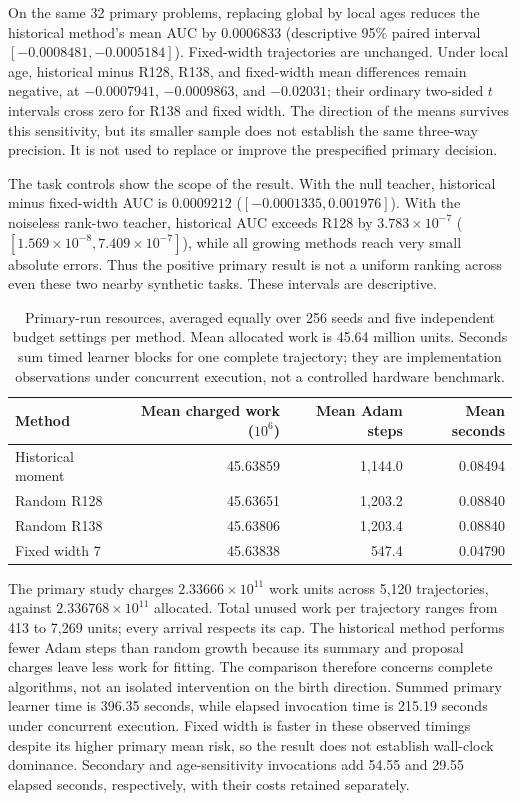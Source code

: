 \documentclass[10pt]{article}
\begin{document}
On the same 32 primary problems, replacing global by local ages
reduces the historical method's mean AUC by $0.0006833$
(descriptive 95\% paired interval $[-0.0008481,-0.0005184]$).
Fixed-width trajectories are unchanged. Under local age, historical
minus R128, R138, and fixed-width mean differences remain negative,
at $-0.0007941$, $-0.0009863$, and $-0.02031$; their ordinary
two-sided $t$ intervals cross zero for R138 and fixed width. The
direction of the means survives this sensitivity, but its smaller
sample does not establish the same three-way precision. It is not
used to replace or improve the prespecified primary decision.

The task controls show the scope of the result. With the null teacher,
historical minus fixed-width AUC is $0.0009212$
($[-0.0001335,0.001976]$). With the noiseless rank-two teacher,
historical AUC exceeds R128 by $3.783\times10^{-7}$
($[1.569\times10^{-8},7.409\times10^{-7}]$), while all growing
methods reach very small absolute errors. Thus the positive primary
result is not a uniform ranking across even these two nearby
synthetic tasks. These intervals are descriptive.

\begin{table}[t]
\centering\small
\begin{tabular}{lrrr}
\toprule
Method & Mean charged work ($10^6$) & Mean Adam steps & Mean seconds\\
\midrule
Historical moment & 45.63859 & 1,144.0 & 0.08494\\
Random R128 & 45.63651 & 1,203.2 & 0.08840\\
Random R138 & 45.63806 & 1,203.4 & 0.08840\\
Fixed width 7 & 45.63838 & 547.4 & 0.04790\\
\bottomrule
\end{tabular}
\caption{Primary-run resources, averaged equally over 256 seeds and
five independent budget settings per method. Mean allocated work
is 45.64 million units. Seconds sum timed learner blocks for one
complete trajectory; they are implementation observations under
concurrent execution, not a controlled hardware benchmark.}
\label{tab:resources}
\end{table}

The primary study charges $2.33666\times10^{11}$ work units across
5,120 trajectories, against $2.336768\times10^{11}$ allocated.
Total unused work per trajectory ranges from 413 to 7,269 units;
every arrival respects its cap. The historical method performs fewer
Adam steps than random growth because its summary and proposal
charges leave less work for fitting. The comparison therefore
concerns complete algorithms, not an isolated intervention on the
birth direction. Summed primary learner time is 396.35 seconds,
while elapsed invocation time is 215.19 seconds under concurrent
execution. Fixed width is faster in these observed timings despite
its higher primary mean risk, so the result does not establish
wall-clock dominance. Secondary and age-sensitivity invocations add
54.55 and 29.55 elapsed seconds, respectively, with their costs
retained separately.
\end{document}
